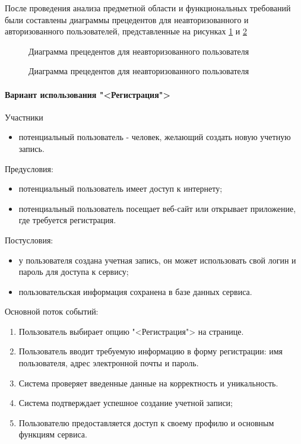 После проведения анализа предметной области и функциональных требований были составлены диаграммы прецедентов для неавторизованного и авторизованного пользователей, представленные на рисунках \ref{uc_noauth:image} и \ref{uc_auth:image}
\vspace{1cm}
\begin{figure}[h]
	\caption{Диаграмма прецедентов для неавторизованного пользователя}
	\label{uc_noauth:image}
\end{figure}

\begin{figure}[h]
	\caption{Диаграмма прецедентов для неавторизованного пользователя}
	\label{uc_auth:image}
\end{figure}
\paragraph{Вариант использования "<Регистрация">}

Участники
\begin{itemize}
	\item потенциальный пользователь - человек, желающий создать новую учетную запись.
\end{itemize}

Предусловия:
\begin{itemize}
	\item потенциальный пользователь имеет доступ к интернету;
	\item потенциальный пользователь посещает веб-сайт или открывает приложение, где требуется регистрация.
\end{itemize}

Постусловия:
\begin{itemize}
	\item у пользователя создана учетная запись, он может использовать свой логин и пароль для доступа к сервису;
	\item пользовательская информация сохранена в базе данных сервиса.
\end{itemize}

Основной поток событий:
\begin{enumerate}
	\item Пользователь выбирает опцию "<Регистрация"> на странице.
	\item Пользователь вводит требуемую информацию в форму регистрации: имя пользователя, адрес электронной почты и пароль.
	\item Система проверяет введенные данные на корректность и уникальность.
	\item Система подтверждает успешное создание учетной записи;
	\item Пользователю предоставляется доступ к своему профилю и основным функциям сервиса.
\end{enumerate}


